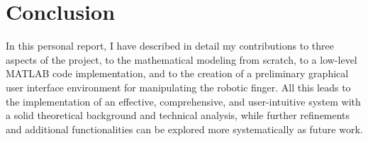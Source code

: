 \documentclass[a4paper,12pt]{article}
\begin{document}
\section{Conclusion}
In this personal report, I have described in detail my contributions to three aspects of the project, to the mathematical modeling from scratch, to a low-level MATLAB code implementation, and to the creation of a preliminary graphical user interface environment for manipulating the robotic finger. All this leads to the implementation of an effective, comprehensive, and user-intuitive system with a solid theoretical background and technical analysis, while further refinements and additional functionalities can be explored more systematically as future work.\\

\newpage

\nocite{*}


\end{document}
